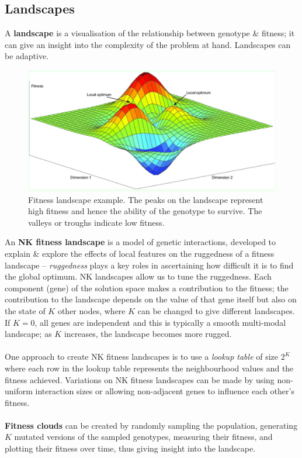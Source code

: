 \documentclass[a4paper,11pt]{article}
\begin{document}
\subsection{Landscapes}
A \textbf{landscape} is a visualisation of the relationship between genotype \& fitness;
it can give an insight into the complexity of the problem at hand.
Landscapes can be adaptive.

\begin{figure}[H]
    \centering
    \includegraphics[width=\textwidth]{./images/landscape.png} \caption{Fitness landscape example. The peaks on the landscape represent high fitness and hence the ability of the genotype to survive. The valleys or troughs indicate low fitness.}
\end{figure}

An \textbf{NK fitness landscape} is a model of genetic interactions, developed to explain \& explore the effects of local features on the ruggedness of a fitness landscape -- \textit{ruggedness} plays a key roles in ascertaining how difficult it is to find the global optimum.
NK landscapes allow us to tune the ruggedness.
Each component (gene) of the solution space makes a contribution to the fitness;
the contribution to the landscape depends on the value of that gene itself but also on the state of $K$ other nodes, where $K$ can be changed to give different landscapes.
If $K=0$, all genes are independent and this is typically a smooth multi-modal landscape; as $K$ increases, the landscape becomes more rugged.
\\\\
One approach to create NK fitness landscapes is to use a \textit{lookup table} of size $2^K$ where each row in the lookup table represents the neighbourhood values and the fitness achieved.
Variations on NK fitness landscapes can be made by using non-uniform interaction sizes or allowing non-adjacent genes to influence each other's fitness.
\\\\
\textbf{Fitness clouds} can be created by randomly sampling the population, generating $K$ mutated versions of the sampled genotypes, measuring their fitness, and plotting their fitness over time, thus giving insight into the landscape.
\end{document}
